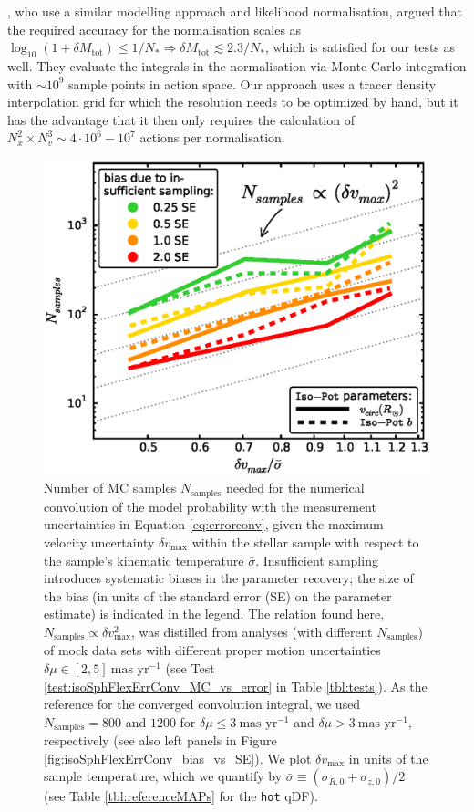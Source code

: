 \documentclass[iop,revtex4,numberedappendix,appendixfloats]{emulateapj}
\begin{document}
\citet{2013MNRAS.433.1411M}, who use a similar modelling approach and likelihood normalisation, argued that the required accuracy for the normalisation scales as $\log_{10} \left(1+\delta M_\text{tot} \right) \leq 1 / N_* \Rightarrow \delta M_\text{tot} \lesssim 2.3/N_*$, which is satisfied for our tests as well. They evaluate the integrals in the normalisation via Monte-Carlo integration with $\sim 10^9$ sample points in action space. Our approach uses a tracer density interpolation grid for which the resolution needs to be optimized by hand, but it has the advantage that it then only requires the calculation of $N_x^2 \times N_v^3 \sim 4\cdot 10^{6} - 10^7$ actions per normalisation.

\begin{figure}[!htbp]
\centering
\includegraphics[width=\columnwidth]{isoSphFlexErrConv_MC_vs_error_3.eps}
\caption{Number of MC samples $N_\text{samples}$ needed for the numerical convolution of the model probability with the measurement uncertainties in Equation \eqref{eq:errorconv}, given the maximum velocity uncertainty $\delta v_\text{max}$ within the stellar sample with respect to the sample's kinematic temperature $\bar{\sigma}$. Insufficient sampling introduces systematic biases in the parameter recovery; the size of the bias (in units of the standard error (SE) on the parameter estimate) is indicated in the legend. The relation found here, $N_\text{samples} \propto \delta v_\text{max}^2$, was distilled from analyses (with different $N_\text{samples}$) of mock data sets with different proper motion uncertainties $\delta \mu \in [2,5]~\text{mas yr}^{-1}$ (see Test \ref{test:isoSphFlexErrConv_MC_vs_error} in Table \ref{tbl:tests}). As the reference for the converged convolution integral, we used $N_\text{samples} = 800$ and $1200$ for $\delta \mu \leq 3~\text{mas yr}^{-1}$ and $\delta \mu > 3~\text{mas yr}^{-1}$, respectively (see also left panels in Figure \ref{fig:isoSphFlexErrConv_bias_vs_SE}). We plot $\delta v_\text{max}$ in units of the sample temperature, which we quantify by $\bar{\sigma} \equiv (\sigma_{R,0} + \sigma_{z,0})/2$ (see Table \ref{tbl:referenceMAPs} for the \texttt{hot} qDF).}
\label{fig:isoSphFlexErrConv_MC_vs_error}
\end{figure}
\end{document}
